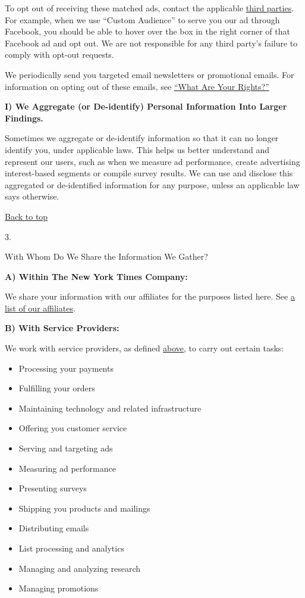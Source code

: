 To opt out of receiving these matched ads, contact the applicable
\href{/privacy/third-party}{third parties}. For example, when we use
``Custom Audience'' to serve you our ad through Facebook, you should be
able to hover over the box in the right corner of that Facebook ad and
opt out. We are not responsible for any third party's failure to comply
with opt-out requests.

We periodically send you targeted email newsletters or promotional
emails. For information on opting out of these emails, see
\protect\hyperlink{anchor-question4}{``What Are Your Rights?''}

\textbf{I) We Aggregate (or De-identify) Personal Information Into
Larger Findings.}

Sometimes we aggregate or de-identify information so that it can no
longer identify you, under applicable laws. This helps us better
understand and represent our users, such as when we measure ad
performance, create advertising interest-based segments or compile
survey results. We can use and disclose this aggregated or de-identified
information for any purpose, unless an applicable law says otherwise.

\href{app}{Back to top}

3.

With Whom Do We Share the Information We Gather?

\textbf{A) Within The New York Times Company:}

We share your information with our affiliates for the purposes listed
here. See
\href{https://help.nytimes3xbfgragh.onion/hc/en-us/articles/360004990014}{a
list of our affiliates}.

\textbf{B) With Service Providers:}

We work with service providers, as defined
\protect\hyperlink{anchor-question2-sectionE}{above}, to carry out
certain tasks:

\begin{itemize}
\tightlist
\item
  Processing your payments
\item
  Fulfilling your orders
\item
  Maintaining technology and related infrastructure
\item
  Offering you customer service
\item
  Serving and targeting ads
\item
  Measuring ad performance
\item
  Presenting surveys
\item
  Shipping you products and mailings
\item
  Distributing emails
\item
  List processing and analytics
\item
  Managing and analyzing research
\item
  Managing promotions
\end{itemize}

